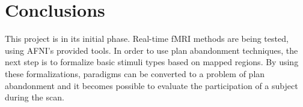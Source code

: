 \documentclass[twocolumn]{bmcart}%
\begin{document}
\section{Conclusions}\label{conclusions}

This project is in its initial phase. Real-time fMRI methods are being
tested, using AFNI's provided tools. In order to use plan abandonment
techniques, the next step is to formalize basic stimuli types based on
mapped regions. By using these formalizations, paradigms can be
converted to a problem of plan abandonment and it becomes possible to
evaluate the participation of a subject during the scan.

\end{document}
